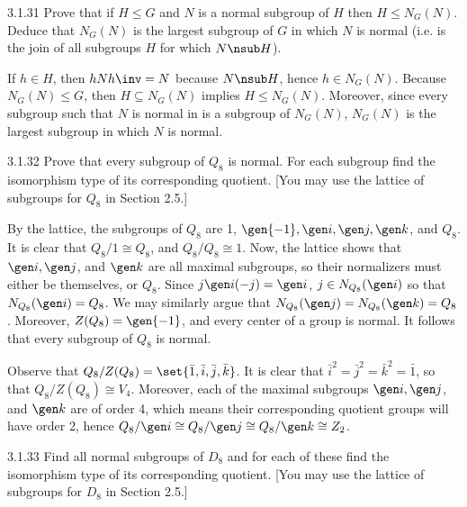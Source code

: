 \begin{exercise}{3.1.31}
    Prove that if $H \le G$ and $N$ is a normal subgroup of $H$ then $H \le N_G(N)$.
	Deduce that $N_G(N)$ is the largest subgroup of $G$ in which $N$ is normal (i.e.
	is the join of all subgroups $H$ for which $N \nsub H$).
\end{exercise}

\begin{sol}
    If $h \in H$, then $hNh\inv = N$ because $N \nsub H$, hence $h \in N_G(N)$.
	Because $N_G(N) \leq G$, then $H \subseteq N_G(N)$ implies $H \leq N_G(N)$.
	Moreover, since every subgroup such that $N$ is normal in is a subgroup of $N_G(N)$, $N_G(N)$ is the largest subgroup in which $N$ is normal.
\end{sol}

\begin{exercise}{3.1.32}
    Prove that every subgroup of $Q_8$ is normal.
	For each subgroup find the isomorphism type of its corresponding quotient. [You may use the lattice of subgroups for $Q_8$ in Section 2.5.]
\end{exercise}

\begin{sol}
    By the lattice, the subgroups of $Q_8$ are 1, $\gen{-1}, \gen i, \gen j, \gen k$, and $Q_8$.
	It is clear that $Q_8/1 \cong Q_8$, and $Q_8/Q_8 \cong 1$.
	Now, the lattice shows that $\gen i, \gen j$, and $\gen k$ are all maximal subgroups, so their normalizers must either be themselves, or $Q_8$.
	Since $j\gen i (-j) = \gen i$, $j \in N_{Q_8}(\gen i)$ so that $N_{Q_8}(\gen i) = Q_8$.
	We may similarly argue that $N_{Q_8}(\gen j) = N_{Q_8}(\gen k) = Q_8$.
	Moreover, $Z(Q_8) = \gen{-1}$, and every center of a group is normal.
	It follows that every subgroup of $Q_8$ is normal.
    
    Observe that $Q_8/Z(Q_8) = \set{\bar 1, \bar i, \bar j, \bar k}$.
	It is clear that $\bar i^2 = \bar j^2 = \bar k^2 = \bar 1$, so that $Q_8/Z(Q_8) \cong V_4$.
	Moreover, each of the maximal subgroups $\gen i, \gen j$, and $\gen k$ are of order 4, which means their corresponding quotient groups will have order 2, hence $Q_8/\gen i \cong Q_8/\gen j \cong Q_8/\gen k \cong Z_2$.
\end{sol}

\begin{exercise}{3.1.33}
    Find all normal subgroups of $D_8$ and for each of these find the isomorphism type of its corresponding quotient. [You may use the lattice of subgroups for $D_8$ in Section 2.5.]
\end{exercise}

